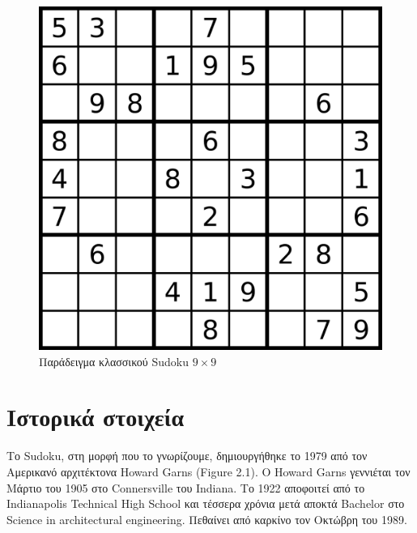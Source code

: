 \documentclass[oneside,12pt]{book}
\theoremstyle{definition}
\begin{document}
\begin{figure}[h]
	\centering
	\includegraphics[scale=0.3]{Figures/classicSUDOKU.jpeg}
	\caption{Παράδειγμα κλασσικού Sudoku \( 9 \times 9\) }
\end{figure}

\chapter{Ιστορικά στοιχεία}

Το Sudoku, στη μορφή που το γνωρίζουμε, δημιουργήθηκε το 1979 από τον Αμερικανό αρχιτέκτονα Howard Garns (Figure 2.1). O Howard Garns \cite{1} γεννιέται τον Μάρτιο του 1905 στο Connersville του Indiana. Το 1922 αποφοιτεί από το Indianapolis Technical High School και τέσσερα χρόνια μετά αποκτά Bachelor στο Science in architectural engineering. Πεθαίνει από καρκίνο τον Οκτώβρη του 1989.  \par
\end{document}
